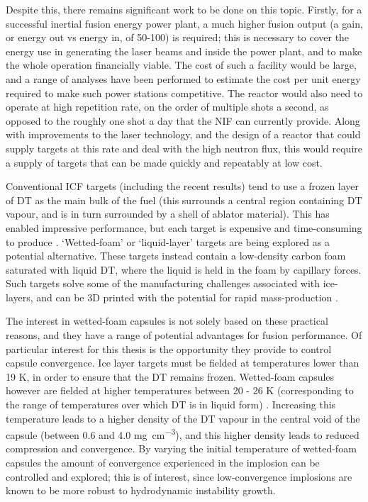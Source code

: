 Despite this, there remains significant work to be done on this topic. Firstly, for a successful inertial fusion energy power plant, a much higher fusion output (a gain, or energy out vs energy in, of 50-100) is required; this is necessary to cover the energy use in generating the laser beams and inside the power plant, and to make the whole operation financially viable. The cost of such a facility would be large, and a range of analyses have been performed to estimate the cost per unit energy required to make such power stations competitive. The reactor would also need to operate at high repetition rate, on the order of multiple shots a second, as opposed to the roughly one shot a day that the NIF can currently provide. Along with improvements to the laser technology, and the design of a reactor that could supply targets at this rate and deal with the high neutron flux, this would require a supply of targets that can be made quickly and repeatably at low cost.

Conventional ICF targets (including the recent results) tend to use a frozen layer of DT as the main bulk of the fuel (this surrounds a central region containing DT vapour, and is in turn surrounded by a shell of ablator material). This has enabled impressive performance, but each target is expensive and time-consuming to produce \cite{Goncharov2020}. `Wetted-foam' or `liquid-layer' targets are being explored as a potential alternative. These targets instead contain a low-density carbon foam saturated with liquid DT, where the liquid is held in the foam by capillary forces. Such targets solve some of the manufacturing challenges associated with ice-layers, and can be 3D printed with the potential for rapid mass-production \cite{Olson2021}.

The interest in wetted-foam capsules is not solely based on these practical reasons, and they have a range of potential advantages for fusion performance. Of particular interest for this thesis is the opportunity they provide to control capsule convergence. Ice layer targets must be fielded at temperatures lower than 19 K, in order to ensure that the DT remains frozen. Wetted-foam capsules however are fielded at higher temperatures between 20 - 26 K (corresponding to the range of temperatures over which DT is in liquid form) \cite{Olson2016}. Increasing this temperature leads to a higher density of the DT vapour in the central void of the capsule (between 0.6 and 4.0 \unit{\milli\gram\per\centi\meter\cubed}), and this higher density leads to reduced compression and convergence. By varying the initial temperature of wetted-foam capsules the amount of convergence experienced in the implosion can be controlled and explored; this is of interest, since low-convergence implosions are known to be more robust to hydrodynamic instability growth.

